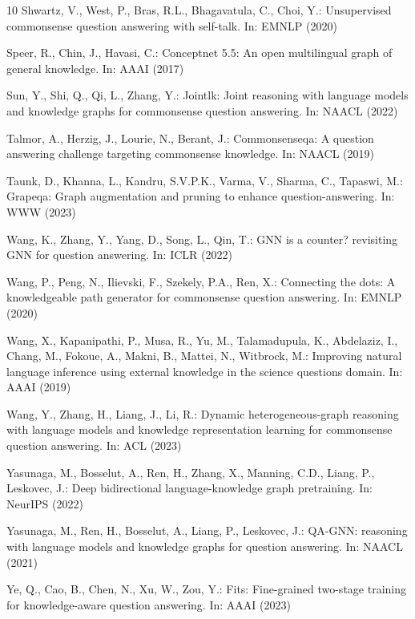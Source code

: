 \documentclass[runningheads]{llncs}
\begin{document}
\begin{thebibliography}{10}
Shwartz, V., West, P., Bras, R.L., Bhagavatula, C., Choi, Y.: Unsupervised
  commonsense question answering with self-talk. In: EMNLP (2020)

Speer, R., Chin, J., Havasi, C.: Conceptnet 5.5: An open multilingual graph of
  general knowledge. In: AAAI (2017)

Sun, Y., Shi, Q., Qi, L., Zhang, Y.: Jointlk: Joint reasoning with language
  models and knowledge graphs for commonsense question answering. In: NAACL
  (2022)

Talmor, A., Herzig, J., Lourie, N., Berant, J.: Commonsenseqa: {A} question
  answering challenge targeting commonsense knowledge. In: NAACL (2019)

Taunk, D., Khanna, L., Kandru, S.V.P.K., Varma, V., Sharma, C., Tapaswi, M.:
  Grapeqa: Graph augmentation and pruning to enhance question-answering. In:
  WWW (2023)

Wang, K., Zhang, Y., Yang, D., Song, L., Qin, T.: {GNN} is a counter?
  revisiting {GNN} for question answering. In: ICLR (2022)

Wang, P., Peng, N., Ilievski, F., Szekely, P.A., Ren, X.: Connecting the dots:
  {A} knowledgeable path generator for commonsense question answering. In:
  EMNLP (2020)

Wang, X., Kapanipathi, P., Musa, R., Yu, M., Talamadupula, K., Abdelaziz, I.,
  Chang, M., Fokoue, A., Makni, B., Mattei, N., Witbrock, M.: Improving natural
  language inference using external knowledge in the science questions domain.
  In: AAAI (2019)

Wang, Y., Zhang, H., Liang, J., Li, R.: Dynamic heterogeneous-graph reasoning
  with language models and knowledge representation learning for commonsense
  question answering. In: ACL (2023)

Yasunaga, M., Bosselut, A., Ren, H., Zhang, X., Manning, C.D., Liang, P.,
  Leskovec, J.: Deep bidirectional language-knowledge graph pretraining. In:
  NeurIPS (2022)

Yasunaga, M., Ren, H., Bosselut, A., Liang, P., Leskovec, J.: {QA-GNN:}
  reasoning with language models and knowledge graphs for question answering.
  In: NAACL (2021)

Ye, Q., Cao, B., Chen, N., Xu, W., Zou, Y.: Fits: Fine-grained two-stage
  training for knowledge-aware question answering. In: AAAI (2023)


\end{thebibliography}
\end{document}
